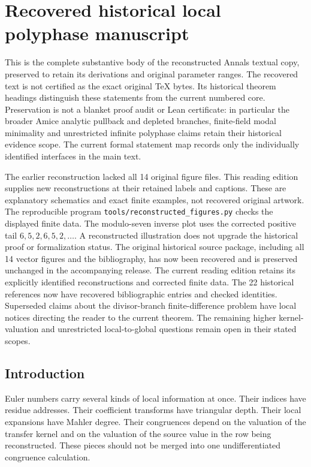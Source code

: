 \clearpage\section{Recovered historical local polyphase manuscript}\label{app:recovered}
This is the complete substantive body of the reconstructed Annals textual
copy, preserved to retain its derivations and original parameter ranges.
The recovered text is not certified as the exact original TeX bytes. Its
historical theorem headings distinguish these statements from the current
numbered core. Preservation is not a blanket proof audit or Lean certificate:
in particular the broader Amice analytic pullback and depleted branches,
finite-field modal minimality and unrestricted infinite polyphase claims
retain their historical evidence scope. The current formal statement map
records only the individually identified interfaces in the main text.

The earlier reconstruction lacked all 14 original figure files. This
reading edition supplies new reconstructions at their retained labels and
captions. These are explanatory schematics and exact finite examples, not
recovered original artwork. The reproducible program
\nolinkurl{tools/reconstructed_figures.py} checks the displayed finite data.
The modulo-seven inverse plot uses the corrected positive tail
$6,5,2,6,5,2,\ldots$. A reconstructed illustration does not upgrade the
historical proof or formalization status. The original historical source
package, including all 14 vector figures and the bibliography, has now been
recovered and is preserved unchanged in the accompanying release. The current
reading edition retains its explicitly identified reconstructions and corrected
finite data. The 22 historical references now have recovered bibliographic
entries and checked identities. Superseded claims about the divisor-branch
finite-difference problem have local notices directing the reader to the
current theorem. The remaining higher kernel-valuation and unrestricted
local-to-global questions remain open in their stated scopes.

\subsection{Introduction}\label{hist:sec:introduction}

Euler numbers carry several kinds of local information at once. Their indices have residue addresses. Their coefficient transforms have triangular depth. Their local expansions have Mahler degree. Their congruences depend on the valuation of the transfer kernel and on the valuation of the source value in the row being reconstructed. These pieces should not be merged into one undifferentiated congruence calculation.

